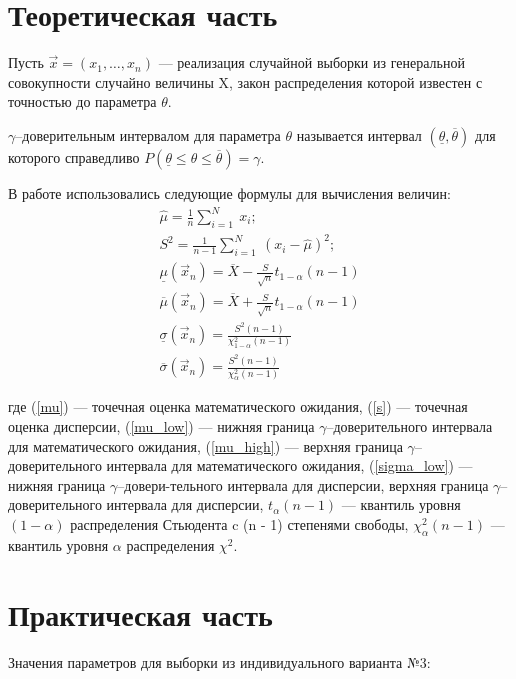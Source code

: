 \chapter{Теоретическая часть}

Пусть $\vec{x} = (x_1, \dots, x_n)$ --- реализация случайной выборки из генеральной совокупности случайно величины X, закон распределения которой известен с точностью до параметра $\theta$.

$\gamma$--доверительным интервалом для параметра $\theta$ называется интервал $(\underline{\theta}, \overline{\theta})$ для которого справедливо $P(\underline{\theta} \leq \theta \leq \overline{\theta}) = \gamma$.

В работе использовались следующие формулы для вычисления величин:
\begin{gather}
	\label{mu}
	\hat\mu = \frac{1}{n}\sum_{i = 1}^{N}~x_i;\\
	\label{s}
	S^2 = \frac{1}{n - 1}\sum_{i = 1}^{N}~(x_i - \hat\mu)^2;\\
	\label{mu_low}
	\underline{\mu}(\vec{x}_n) = \overline{X} - \frac{S}{\sqrt{n}}t_{1-\alpha}(n-1)\\
	\label{mu_high}
	\overline{\mu}(\vec{x}_n) = \overline{X} + \frac{S}{\sqrt{n}}t_{1-\alpha}(n-1)\\
	\label{sigma_low}
	\underline{\sigma}(\vec{x}_n) = \frac{S^2(n-1)}{\chi^2_{1-\alpha}(n-1)}\\
	\label{sigma_high}
	\overline{\sigma}(\vec{x}_n) = \frac{S^2(n-1)}{\chi^2_\alpha(n-1)}
\end{gather}

где (\ref{mu}) --- точечная оценка математического ожидания, (\ref{s}) --- точечная оценка дисперсии, (\ref{mu_low}) --- нижняя граница $\gamma$--доверительного интервала для математического ожидания, (\ref{mu_high}) --- верхняя граница $\gamma$--доверительного интервала для математического ожидания, (\ref{sigma_low}) --- нижняя граница $\gamma$--довери-тельного интервала для дисперсии, верхняя граница $\gamma$--доверительного интервала для дисперсии, $t_{\alpha}(n-1)$ --- квантиль уровня $(1 - \alpha)$ распределения Стьюдента c (n - 1) степенями свободы, $\chi^2_{\alpha}(n-1)$ --- квантиль уровня $\alpha$ распределения $\chi^2$.

\chapter{Практическая часть}

Значения параметров для выборки из индивидуального варианта №3:

